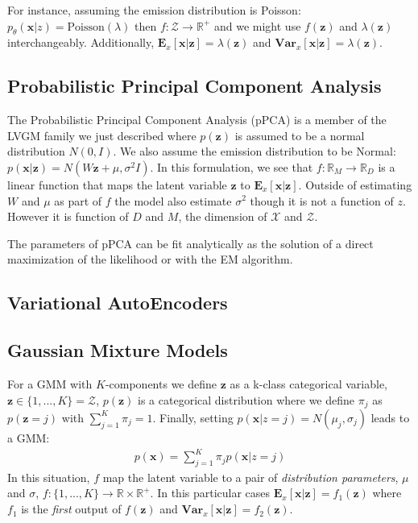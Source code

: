 \documentclass{article}
\newcommand{\Vx}{\textbf{Var}_x}
\newcommand{\Ex}{\textbf{E}_x}
\newcommand{\x}{\mathbf{x}}
\newcommand{\z}{\mathbf{z}}
\begin{document}
\bigskip

For instance, assuming the emission distribution is Poisson: $p_\theta(\x|z) = \text{Poisson}(\lambda)$ then $f: \mathcal{Z} \rightarrow \mathbb{R}^+$ and we might use $f(\z)$ and $\lambda(\z)$ interchangeably. Additionally, $\Ex[\x|\z] = \lambda(\z)$ and $ \Vx[\x|\z] = \lambda(\z)$. 


\subsection{Probabilistic Principal Component Analysis}

The Probabilistic Principal Component Analysis (pPCA) \cite{tipping99,Bishop07} is a member of the LVGM family we just described where $p(\z)$ is assumed to be a normal distribution $N(0,I)$. We also assume the emission distribution to be Normal: $p(\x|\z) = N(W\z+\mu,\sigma^2I)$. In this formulation, we see that $f: \mathbb{R}_M \rightarrow \mathbb{R}_D$ is a linear function that maps the latent variable $\z$ to $\Ex[\x|\z]$. Outside of estimating $W$ and $\mu$ as part of $f$ the model also estimate $\sigma^2$ though it is not a function of $z$. However it is function of $D$ and $M$, the dimension of $\mathcal{X}$ and $\mathcal{Z}$. 

\bigskip

The parameters of pPCA can be fit analytically as the solution of a direct maximization of the likelihood or with the EM algorithm.   

\subsection{Variational AutoEncoders}

\subsection{Gaussian Mixture Models}

For a GMM with $K$-components we define $\z$ as a k-class categorical variable, $\z \in \{1,...,K\} = \mathcal{Z}$, $p(\z)$ is a categorical distribution where we define $\pi_j$ as $p(\z = j)$ with $\sum_{j=1}^K \pi_j =1$. Finally, setting $p(\x|z=j) = N(\mu_j,\sigma_j)$ leads to a GMM:
\begin{align}
p(\x) = \sum_{j=1}^K \pi_j p(\x|z=j) 
\label{LVM}
\end{align}
In this situation, $f$ map the latent variable to a pair of \textit{distribution parameters}, $\mu$ and $\sigma$, $f: \{1,...,K\} \rightarrow \mathbb{R}\times\mathbb{R}^+$. In this particular cases  $\Ex[\x|\z] = f_1(\z)$ where $f_1$ is the \textit{first} output of $f(\z)$ and $\Vx[\x|\z] = f_2(\z)$.
\end{document}
